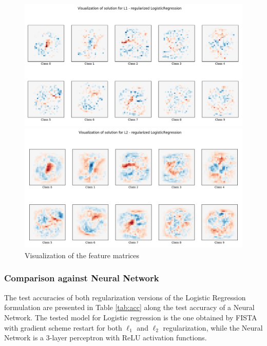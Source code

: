 \documentclass{article}
\begin{document}
\begin{figure}[H]
    \centering
    \begin{minipage}{.9\textwidth}
        \includegraphics[trim={.5cm .5cm .5cm 0},clip, width=\textwidth]{img/visual_l1.png}
    \end{minipage}
    \begin{minipage}{.9\textwidth}
        \includegraphics[trim={.5cm .5cm .5cm 0},clip,width=\textwidth]{img/visual_l2.png}
    \end{minipage}
    \caption{Visualization of the feature matrices}
    \label{fig:vis}
\end{figure}

\subsubsection*{Comparison against Neural Network}
The test accuracies of both regularization versions of the Logistic Regression formulation are presented in Table \ref{tab:acc} along the test accuracy of a Neural Network. The tested model for Logistic regression is the one obtained by FISTA with gradient scheme restart for both $\ell_1$ and $\ell_2$ regularization, while the Neural Network is a 3-layer perceptron with ReLU activation functions.
\end{document}
